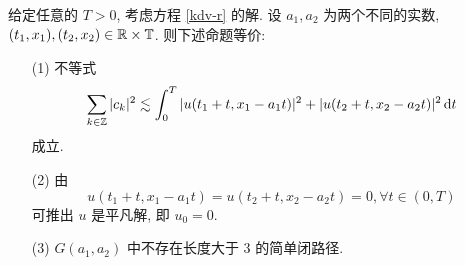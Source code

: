 \begin{theorem}\label{abstract-thm}
给定任意的 $T>0$, 考虑方程 \eqref{kdv-r} 的解. 设 $a_1,a_2$ 为两个不同的实数, $(t_1,x_1),(t_2,x_2)\in \mathbb{R}\times \mathbb{T}$.   则下述命题等价:
\begin{enumerate}
    \item[\rm{(1)}] 不等式 
    \begin{equation}\label{obs-two-points} 
    \sum\limits_{k\in \mathbb{Z}} |c_k|^2\lesssim\int_0^T |u(t_1+t,x_1-a_1t)|^2 + |u(t_2+t,x_2-a_2t)|^2\,\mathrm{d} t
\end{equation}
成立.
    \item [\rm{(2)}] 由
\begin{equation*}
    u(t_1+t,x_1-a_1t)=u(t_2+t,x_2-a_2t)=0, \forall t\in (0,T)
\end{equation*}
可推出 $u$ 是平凡解, 即 $u_0=0$.
   \item[\rm{(3)}]  $G(a_1,a_2)$ 中不存在长度大于 $3$ 的简单闭路径.
\end{enumerate}
\end{theorem}
